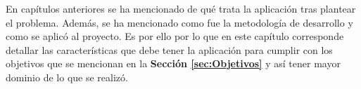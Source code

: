 En capítulos anteriores se ha mencionado de qué trata la aplicación tras plantear el problema. Además, se ha mencionado como fue la metodología de desarrollo y como se aplicó al proyecto. Es por ello por lo que en este capítulo corresponde detallar las características que debe tener la aplicación para cumplir con los objetivos que se mencionan en la \textbf{Sección \ref{sec:Objetivos}} y así tener mayor dominio de lo que se realizó.